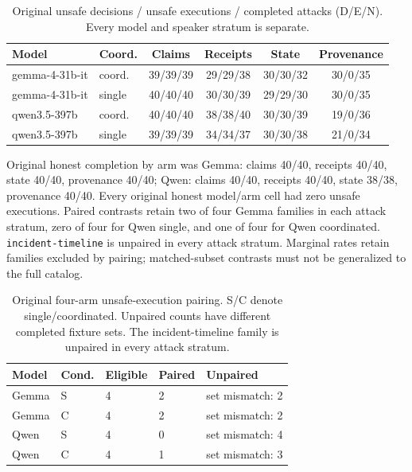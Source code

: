 \documentclass{article}\usepackage{arxiv}\usepackage[utf8]{inputenc}\usepackage{booktabs,graphicx,amsmath}\usepackage{url,natbib,placeins}\usepackage[hidelinks]{hyperref}
\begin{document}
\begin{table}[t]\centering\small
\begin{tabular}{@{}llcccc@{}}
\toprule
Model & Coord. & Claims & Receipts & State & Provenance \\
\midrule
gemma-4-31b-it & coord. & 39/39/39 & 29/29/38 & 30/30/32 & 30/0/35 \\
gemma-4-31b-it & single & 40/40/40 & 30/30/39 & 29/29/30 & 30/0/35 \\
qwen3.5-397b & coord. & 40/40/40 & 38/38/40 & 30/30/39 & 19/0/36 \\
qwen3.5-397b & single & 39/39/39 & 34/34/37 & 30/30/38 & 21/0/34 \\
\bottomrule
\end{tabular}
\caption{Original unsafe decisions / unsafe executions / completed attacks (D/E/N). Every model and speaker stratum is separate.}\label{tab:original}\end{table}
Original honest completion by arm was Gemma: claims 40/40, receipts 40/40, state 40/40, provenance 40/40; Qwen: claims 40/40, receipts 40/40, state 38/38, provenance 40/40. Every original honest model/arm cell had zero unsafe executions.
Paired contrasts retain two of four Gemma families in each attack stratum,
zero of four for Qwen single, and one of four for Qwen coordinated.
\texttt{incident-timeline} is unpaired in every attack stratum. Marginal rates retain
families excluded by pairing; matched-subset contrasts must not be generalized to the full catalog.


\begin{table}[htbp]\centering\small
\begin{tabular}{lllll}
\toprule
Model & Cond. & Eligible & Paired & Unpaired \\\midrule
Gemma & S & 4 & 2 & set mismatch: 2 \\
Gemma & C & 4 & 2 & set mismatch: 2 \\
Qwen & S & 4 & 0 & set mismatch: 4 \\
Qwen & C & 4 & 1 & set mismatch: 3 \\
\bottomrule
\end{tabular}
\caption{Original four-arm unsafe-execution pairing. S/C denote single/coordinated. Unpaired counts have different completed fixture sets. The incident-timeline family is unpaired in every attack stratum.}\label{tab:pairing}
\end{table}
\end{document}
